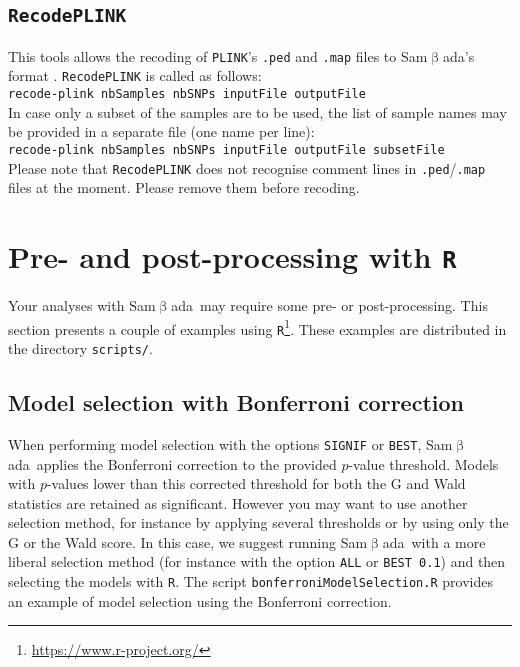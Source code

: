\documentclass[a4paper,11pt]{article}
\newcommand{\smb}{\textsf{Sam$\upbeta$ada}}
\newcommand{\prog}[1]{\texttt{#1}}
\begin{document}
\subsection{\prog{RecodePLINK}}
This tools allows the recoding of \prog{PLINK}'s \prog{.ped} and \prog{.map} files to \smb's format \parencite[see][for further information on this format]{purcell:2009}.
\prog{RecodePLINK} is called as follows:\\
\verb+recode-plink nbSamples nbSNPs inputFile outputFile+\\
In case only a subset of the samples are to be used, the list of sample names may be provided in a separate file (one name per line):\\
\verb+recode-plink nbSamples nbSNPs inputFile outputFile subsetFile+\\
Please note that \prog{RecodePLINK} does not recognise comment lines in \prog{.ped}/\prog{.map} files at the moment. 
Please remove them before recoding.

\section{Pre- and post-processing with \prog{R}}

Your analyses with \smb\ may require some pre- or post-processing.
This section presents a couple of examples using \prog{R}\footnote{\url{https://www.r-project.org/}}.
These examples are distributed in the directory \prog{scripts/}.

\subsection*{Model selection with Bonferroni correction\label{model-selection-R}}

When performing model selection with the options \prog{SIGNIF} or \prog{BEST}, \smb\ applies the Bonferroni correction to the provided $p$-value threshold.
Models with $p$-values lower than this corrected threshold for both the G and Wald statistics are retained as significant.
However you may want to use another selection method, for instance by applying several thresholds or by using only the G or the Wald score.
In this case, we suggest running \smb\ with a more liberal selection method (for instance with the option \prog{ALL} or \prog{BEST 0.1}) and then selecting the models with \prog{R}.
The script \prog{bonferroniModelSelection.R} provides an example of model selection using the Bonferroni correction.

\clearpage
\end{document}
